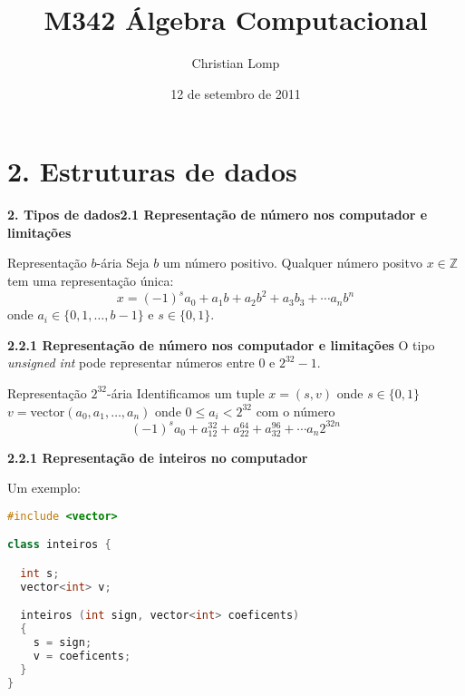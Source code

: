 \documentclass{beamer}
\title[M342]{M342 Álgebra Computacional}
\author{Christian Lomp}
\institute{FCUP}
\date{12 de setembro de 2011}
\newcommand{\ZZ}{\mathbb Z}
\newcommand{\cvector}[1]{\mathrm{vector}(#1)}
\begin{document}
\begin{frame}
\titlepage
\end{frame}





\section{2. Estruturas de dados}

\begin{frame}{\bf 2. Tipos de dados}{\bf 2.1 Representação de número nos computador e limitações}

\begin{block}{Representação $b$-ária}
Seja $b$ um número positivo. Qualquer número positvo $x\in \ZZ$ tem uma representação única:
$$ x = (-1)^s a_0 + a_1b + a_2b^2 + a_3b_3 + \cdots a_nb^n$$
onde $a_i \in \{0,1,\ldots, b-1\}$ e $s\in\{0,1\}$.
\end{block}

\end{frame}


\begin{frame}{\bf 2.}{\bf 2.1 Representação de número nos computador e limitações}
O tipo {\it unsigned int} pode representar números entre $0$ e $2^{32}-1$.

\begin{block}{Representação $2^{32}$-ária}
Identificamos um tuple $x=(s,v)$ onde $s\in \{0,1\}$ $v=\cvector{a_0,a_1,\ldots, a_n}$ onde $0\leq a_i < 2^{32}$ com o número 
$$ (-1)^s a_0 + a_12^{32} + a_22^{64} + a_32^{96} + \cdots a_n2^{32n}$$
\end{block}

\end{frame}



\begin{frame}[fragile]{\bf 2.}{\bf 2.1 Representação de inteiros no computador}

Um exemplo:

\begin{lstlisting}[language=C++]
#include <vector>

class inteiros {

  int s;
  vector<int> v;

  inteiros (int sign, vector<int> coeficents)
  {
    s = sign;
    v = coeficents;
  }
}

\end{lstlisting}

\end{frame}
\end{document}
